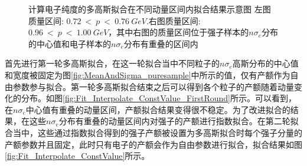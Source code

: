 \begin{figure}[h!]
\begin{subfigure}[h!]{0.45\textwidth}
            \caption{}
            \label{fig:MultGaus_CorssOver_Region}
    \end{subfigure}
    \caption[计算电子纯度的多高斯拟合在不同动量区间内拟合结果示意图]{计算电子纯度的多高斯拟合在不同动量区间内拟合结果示意图 左图质量区间: $ 0.72~<~p~<~0.76~GeV$.右图质量区间: $ 0.96~<~p~<~1.00~GeV$，其中右图的质量区间位于强子样本的$n\sigma_{e}$分布的中心值和电子样本的$n\sigma_{e}$分布有重叠的区间内}
    \label{fig:Multi-Gaussian}
\end{figure}

首先进行第一轮多高斯拟合，在这一轮拟合当中不同粒子的$n\sigma_{e}$高斯分布的中心值和宽度被固定为图\ref{fig:MeanAndSigma_puresample}中所示的值，仅有产额作为自由参数参与拟合。第一轮多高斯拟合结束之后可以得到各个粒子的产额随着动量变化的分布。如图\ref{fig:Fit_Interpolate_ConstValue_FirstRound}所示。可以看到，在$n\sigma_{e}$中心值有重叠的动量区间，产额拟合结果变得很不稳定。为了改进拟合的结果，在这些$n\sigma_{e}$分布有重叠的动量区间内对强子的产额进行指数拟合。在第二轮拟合当中，这些通过指数拟合得到的强子产额被设置为多高斯拟合时每个强子分量的产额参数并且固定，此时只有电子的产额会作为自由参数进行拟合，拟合结果如图\ref{fig:Fit_Interpolate_ConstValue}所示。
